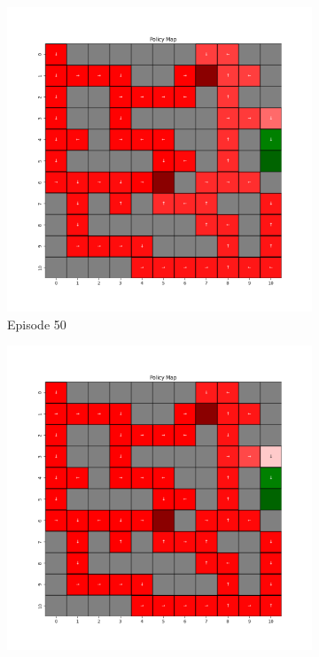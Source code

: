 \documentclass{assignment}
\begin{document}
\begin{figure}[H]
\begin{subfigure}{0.3\textwidth}
        \includegraphics[width=\textwidth]{figures/policy_q/gamma_sweep/policy_alpha_0.1_gamma_0.75_epsilon_0.2_iteration_50.png}
    \caption{Episode 50}
    \end{subfigure}\hfill
    \begin{subfigure}{0.3\textwidth}
        \includegraphics[width=\textwidth]{figures/policy_q/gamma_sweep/policy_alpha_0.1_gamma_0.75_epsilon_0.2_iteration_100.png}

\end{subfigure}
\end{figure}
\end{document}
